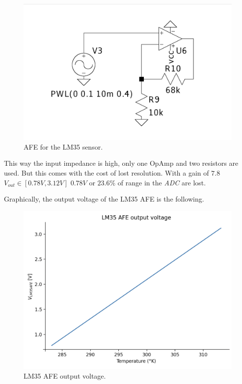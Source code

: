 \documentclass[12pt]{article}
\begin{document}
    \begin{figure}[H] 
        \centering
        \includegraphics*[scale = 0.2]{images/AFELM35.png}
        \caption{AFE for the LM35 sensor.}
        \label{AFELM35}
    \end{figure}

    This way the input impedance is high, only one OpAmp and two resistors are used.
    But this comes with the cost of lost resolution. With a gain of $7.8$ $V_{out}\in[0.78V,3.12V]$
    $0.78V$ or $23.6\%$ of range in the \textit{ADC} are lost.

    Graphically, the output voltage of the LM35 AFE is the following.

    \begin{figure}[H] 
        \centering
        \includegraphics*[scale = 0.5]{images/Outafelm35.png}
        \caption{LM35 AFE output voltage.}
        \label{AFELM35graph}
    \end{figure}
\end{document}
